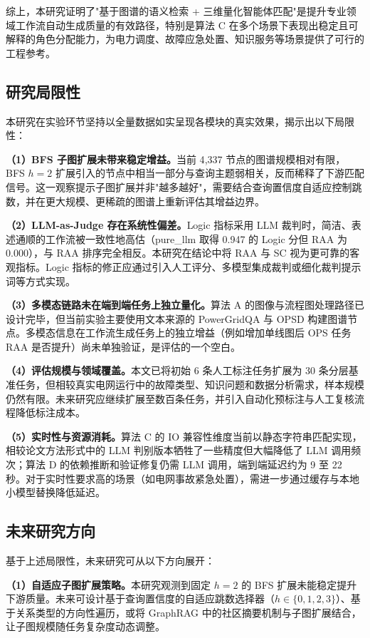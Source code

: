 综上，本研究证明了"基于图谱的语义检索 + 三维量化智能体匹配"是提升专业领域工作流自动生成质量的有效路径，特别是算法 C 在多个场景下表现出稳定且可解释的角色分配能力，为电力调度、故障应急处置、知识服务等场景提供了可行的工程参考。

\subsection{研究局限性}

本研究在实验环节坚持以全量数据如实呈现各模块的真实效果，揭示出以下局限性：

\textbf{（1）BFS 子图扩展未带来稳定增益。}当前 4{,}337 节点的图谱规模相对有限，BFS $h=2$ 扩展引入的节点中相当一部分与查询主题弱相关，反而稀释了下游匹配信号。这一观察提示子图扩展并非"越多越好"，需要结合查询置信度自适应控制跳数，并在更大规模、更稀疏的图谱上重新评估其增益边界。

\textbf{（2）LLM-as-Judge 存在系统性偏差。}Logic 指标采用 LLM 裁判时，简洁、表述通顺的工作流被一致性地高估（pure\_llm 取得 0.947 的 Logic 分但 RAA 为 0.000），与 RAA 排序完全相反。本研究在结论中将 RAA 与 SC 视为更可靠的客观指标。Logic 指标的修正应通过引入人工评分、多模型集成裁判或细化裁判提示词等方式实现。

\textbf{（3）多模态链路未在端到端任务上独立量化。}算法 A 的图像与流程图处理路径已设计完毕，但当前实验主要使用文本来源的 PowerGridQA 与 OPSD 构建图谱节点。多模态信息在工作流生成任务上的独立增益（例如增加单线图后 OPS 任务 RAA 是否提升）尚未单独验证，是评估的一个空白。

\textbf{（4）评估规模与领域覆盖。}本文已将初始 6 条人工标注任务扩展为 30 条分层基准任务，但相较真实电网运行中的故障类型、知识问题和数据分析需求，样本规模仍然有限。未来研究应继续扩展至数百条任务，并引入自动化预标注与人工复核流程降低标注成本。

\textbf{（5）实时性与资源消耗。}算法 C 的 IO 兼容性维度当前以静态字符串匹配实现，相较论文方法形式中的 LLM 判别版本牺牲了一些精度但大幅降低了 LLM 调用频次；算法 D 的依赖推断和验证修复仍需 LLM 调用，端到端延迟约为 9 至 22 秒。对于实时性要求高的场景（如电网事故紧急处置），需进一步通过缓存与本地小模型替换降低延迟。

\subsection{未来研究方向}

基于上述局限性，未来研究可从以下方向展开：

\textbf{（1）自适应子图扩展策略。}本研究观测到固定 $h=2$ 的 BFS 扩展未能稳定提升下游质量。未来可设计基于查询置信度的自适应跳数选择器（$h\in\{0,1,2,3\}$）、基于关系类型的方向性遍历，或将 GraphRAG 中的社区摘要机制与子图扩展结合，让子图规模随任务复杂度动态调整。

